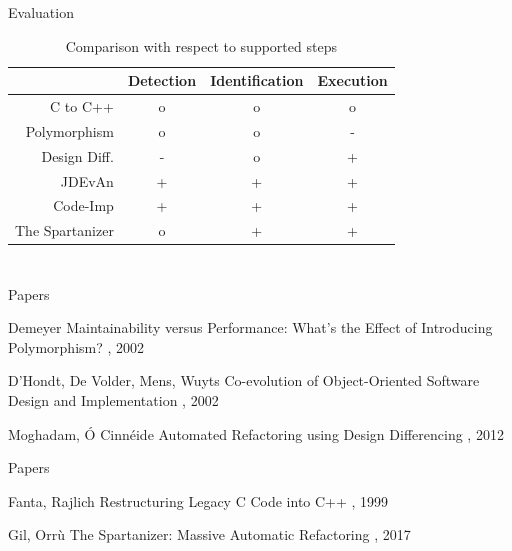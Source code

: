 \documentclass{beamer}
\begin{document}
\begin{frame}{Evaluation}
  \begin{table}[htb]
    \centering
    \caption{Comparison with respect to supported steps}
    \label{tbl:steps}
    \begin{tabular}{r|ccc}
      ~               & Detection & Identification  & Execution \\ \hline
      C to C++        & o         & o               & o \\
      Polymorphism    & o         & o               & - \\
      Design Diff.    & -         & o               & + \\
      JDEvAn          & +         & +               & + \\
      Code-Imp        & +         & +               & + \\
      The Spartanizer & o         & +               & + \\
    \end{tabular}
  \end{table}
\end{frame}

\appendix
\section*{\appendixname}

\begin{frame}{Papers}
  \begin{thebibliography}{10}
    \beamertemplatearticlebibitems
    
      Demeyer
      \newblock Maintainability versus Performance: What's the Effect of Introducing Polymorphism?
      , 2002
    
      D'Hondt, De Volder, Mens, Wuyts
      \newblock Co-evolution of Object-Oriented Software Design and Implementation
      , 2002
    
      Moghadam, Ó Cinnéide
      \newblock Automated Refactoring using Design Differencing
      , 2012
  \end{thebibliography}
\end{frame}

\begin{frame}{Papers}
  \begin{thebibliography}{10}
    \beamertemplatearticlebibitems
    
      Fanta, Rajlich
      \newblock Restructuring Legacy C Code into C++
      , 1999
    
      Gil, Orrù
      \newblock The Spartanizer: Massive Automatic Refactoring
      , 2017
  \end{thebibliography}
\end{frame}
\end{document}
